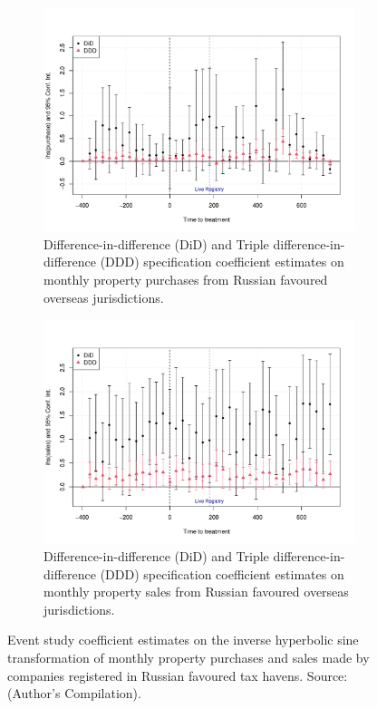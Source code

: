 \documentclass{article}
\begin{document}
\begin{figure}[H]
    \centering
    \begin{subfigure}[b]{0.9\textwidth}
    \includegraphics[width=1\linewidth]{ihs(Purchase)_Russia_Count.pdf}        
    \caption{Difference-in-difference (DiD) and Triple difference-in-difference (DDD) specification coefficient estimates on monthly property purchases from Russian favoured overseas jurisdictions.}
        \label{fig:purchase}
    \end{subfigure}
    
    \begin{subfigure}[b]{0.9\textwidth}
    \includegraphics[width=1\linewidth]{ihs(Sale)_Russia_Count.pdf}
        \caption{Difference-in-difference (DiD) and Triple difference-in-difference (DDD) specification coefficient estimates on monthly property sales from Russian favoured overseas jurisdictions.}
        \label{fig:sale}
    \end{subfigure}
    \caption{Event study coefficient estimates on the inverse hyperbolic sine transformation of monthly property purchases and sales made by companies registered in Russian favoured tax havens. Source: (Author's Compilation).}
    \label{fig:overall}
\end{figure}
\end{document}
